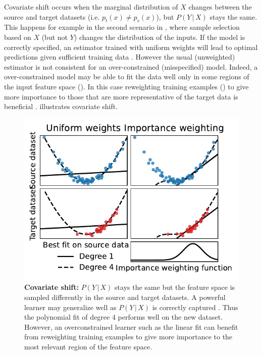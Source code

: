 \documentclass[a4paper,num-refs]{oup-contemporary}
\newcommand{\Prob}{ P }
\newcommand{\giv}{ \,|\, }
\begin{document}
Covariate shift occurs when the marginal distribution of \(X\) changes between
the source and target datasets (i.e. \( p_t(x) \neq p_s(x) \)), but \(P(Y \giv X)\) stays the same.
%
This happens for example in the second scenario in
, where sample selection based on \(X\) (but not
\(Y\)) changes the distribution of the inputs.
%
If the model is correctly specified, an estimator trained with uniform weights
will lead to optimal predictions given sufficient training data
\citep[prediction consistency][Lemma 4]{shimodaira2000improving}.
%
However the usual (unweighted) estimator is not consistent for an
over-constrained (misspecified) model.
%
Indeed, a over-constrained model may be able to fit the data well only in some
regions of the input feature space (). In this case reweighting training examples () to give
more importance to those that are more representative of the target data is
beneficial \citep{storkey2009training,scholkopf2012causal}.
%
 illustrates covariate shift.
%

\begin{figure}
\centering
\includegraphics[width=.7\linewidth]{figures/simulations/covariate_shift/covariate_shift.pdf}
\caption{\label{fig:covariate-shift}\textbf{Covariate shift:} \(\Prob(Y \giv
  X)\) stays the same but the feature space is sampled differently in the source
  and target datasets. A powerful learner may generalize well as \(\Prob(Y \giv
  X)\) is correctly captured \citep{storkey2009training}. Thus the polynomial
  fit of degree 4 performs well on the new dataset. However, an overconstrained
  learner such as the linear fit can benefit from reweighting training examples
  to give more importance to the most relevant region of the feature space.}
\end{figure}
\end{document}
